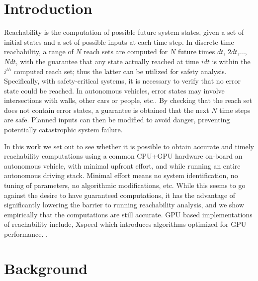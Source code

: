 \documentclass[runningheads]{llncs}
\begin{document}
\section{Introduction}
Reachability is the computation of possible future system states, given a set of initial states and a set of possible inputs at each time step. 
In discrete-time reachability, a range of $N$ reach sets are computed for $N$ future times $dt$, $2dt$,..., $Ndt$, with the guarantee that any state actually reached at time $idt$ is within the $i^{th}$ computed reach set; thus the latter can be utilized for safety analysis\cite{malerintro}.
Specifically, with safety-critical systems, it is necessary to verify that no error state could be reached. In autonomous vehicles, error states may involve intersections with walls, other cars or people, etc.. By checking that the reach set does not contain error states, a guarantee is obtained that the next $N$ time steps are safe.  
Planned inputs can then be modified to avoid danger, preventing potentially catastrophic system failure. 

In this work we set out to see whether it is possible to obtain accurate and timely reachability computations using a common CPU+GPU hardware on-board an autonomous vehicle, with minimal upfront effort, and while running an entire autonomous driving stack.
Minimal effort means no system identification, no tuning of parameters, no algorithmic modifications, etc. 
While this seems to go against the desire to have guaranteed computations, it has the advantage of significantly lowering the barrier to running reachability analysis, and we show empirically that the computations are still accurate. GPU based implementations of reachability include, Xspeed which introduces algorithms optimized for GPU performance. \cite{xspeed}.

\section{Background}
\end{document}
